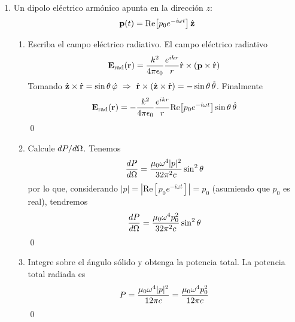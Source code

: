 \documentclass[]{article}
\numberwithin{equation}{section}
\begin{document}
\begin{enumerate}
	\item Un dipolo eléctrico armónico apunta en la dirección $z$:
	\begin{equation}
		\mathbf{p}(t) = \mathrm{Re}\!\left[p_0 e^{-i \omega t}\right]\hat{\mathbf{z}}
	\end{equation}
	\begin{enumerate}
		\item[(a)] Escriba el campo eléctrico radiativo.
		\resp El campo eléctrico radiativo
		\begin{equation}
			\n{E}_\mathrm{rad} (\rv) = \ke[k^2] \frac{e^{ikr}}{r} \rhat\times(\n{p}\times\rhat)
		\end{equation}
		Tomando $\hat{\mathbf{z}}\times\hat{\mathbf{r}} = \sin\theta\,\hat{\mathbf{\varphi}} ~\Rightarrow~ \hat{\mathbf{r}}\times(\hat{\mathbf{z}}\times\hat{\mathbf{r}}) = -\sin\theta\,\hat{\mathbf{\theta}}$. Finalmente
		\begin{equation}
			\n{E}_\mathrm{rad} (\rv) = -\ke[k^2] \frac{e^{ikr}}{r} \mathrm{Re}\!\left[p_0 e^{-i \omega t}\right] \sin\theta\,\that
		\end{equation}
		\qed
		
		\item[(b)] Calcule $d P/d \Omega$.
		\resp Tenemos
		\begin{equation}
			\dfrac{d P}{d \Omega} = \frac{\mu_{0}\omega^4 |p|^2}{32\pi^2 c} \sin^2\theta
		\end{equation}
		por lo que, considerando $|p| = \left|\mathrm{Re}\!\left[p_0 e^{-i \omega t}\right]\right| = p_0$ (asumiendo que $p_0$ es real), tendremos
		\begin{equation}
			\dfrac{d P}{d \Omega} = \frac{\mu_{0}\omega^4 p_0^2}{32\pi^2 c} \sin^2\theta
		\end{equation}
		\qed
		
		\item[(c)] Integre sobre el ángulo sólido y obtenga la potencia total.
		\resp La potencia total radiada es
		\begin{equation}
			P = \frac{\mu_{0}\omega^4 |p|^2}{12 \pi c} = \frac{\mu_{0}\omega^4 p_0^2}{12 \pi c}
		\end{equation}
		\qed
		
	\end{enumerate}	
	

\end{enumerate}
\end{document}
